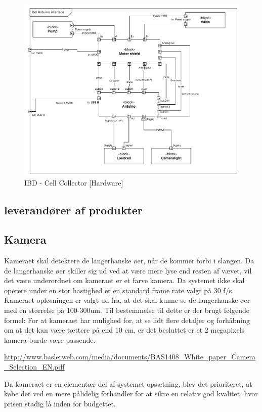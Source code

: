 \begin{figure}[H]
	\centering
	\includegraphics[width=1\textwidth]{pdf/IBD_Hardware(Arduino)_cropped.pdf}
	\caption{IBD - Cell Collector [Hardware]}
	\label{fig:ibd_Hardware}
\end{figure}

\subsection{leverandører af produkter}

\subsection{Kamera}
Kameraet skal detektere de langerhanske øer, når de kommer forbi i slangen.  Da de langerhanske øer skiller sig ud ved at være mere lyse end resten af vævet, vil det være underordnet om kameraet er et farve kamera. Da systemet ikke skal operere under en stor hastighed er en standard frame rate valgt på 30 f/s. Kameraet opløsningen er valgt ud fra, at det skal kunne se de langerhanske øer med en størrelse på 100-300um. Til bestemmelse til dette er der brugt følgende formel:
For at kameraet har mulighed for, at se lidt flere detaljer og forhåbning om at det kan være tættere på end 10 cm, er det besluttet er et 2 megapixels kamera burde være passende.

\url{http://www.baslerweb.com/media/documents/BAS1408_White_paper_Camera_Selection_EN.pdf}


Da kameraet er en elementær del af systemet opsætning, blev det prioriteret, at købe det ved en mere pålidelig forhandler for at sikre en relativ god kvalitet, hvor prisen stadig lå inden for budgettet.  

